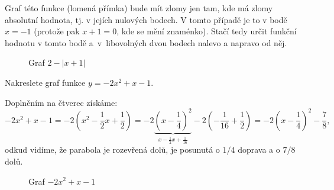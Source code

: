 \begin{reseni}
	Graf této funkce (lomená přímka) bude mít zlomy jen tam, kde má zlomy absolutní hodnota,
	tj. v jejích nulových bodech. V tomto případě je to v bodě $x=-1$
	(protože pak $x+1=0$, kde se mění znaménko). Stačí tedy určit funkční hodnotu v tomto bodě
	a~v~libovolných dvou bodech nalevo a napravo od něj.
	\begin{figure}[ht!]
        \begin{center}
        \caption{Graf $2- |x+1|$}
        \end{center}
        \end{figure}
\end{reseni}

\begin{priklad}
Nakreslete graf funkce $y=-2x^2+x-1$.
\end{priklad}

\begin{reseni}
Doplněním na čtverec získáme:
$$
	-2x^2+x-1 = -2 \left( x^2-\frac{1}{2}x+\frac{1}{2} \right ) = -2 \underbrace{\left( x-\frac{1}{4} \right )^2}_{x-\frac{1}{2}x+\frac{1}{16}} -2\left(-\frac{1}{16}+\frac{1}{2}\right)=-2 \left( x- \frac{1}{4} \right )^2-\frac{7}{8},
$$
odkud vidíme, že parabola je rozevřená dolů, je posunutá o $1/4$ doprava a o $7/8$ dolů.
\begin{figure}[ht!]
       \begin{center}
       \caption{Graf $-2x^2+x-1$}
       \end{center}
       \end{figure}
\end{reseni}

